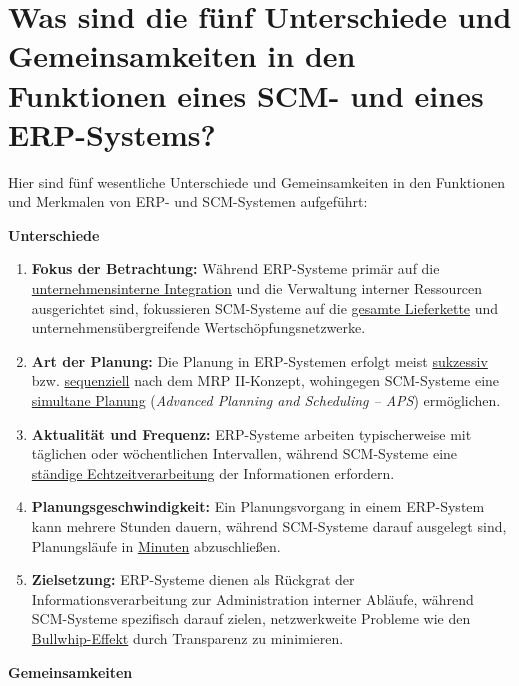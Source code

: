 \section{Was sind die fünf Unterschiede und Gemeinsamkeiten in den Funktionen eines \acs{SCM}- und eines \acs{ERP}-Systems?} \par Hier sind fünf wesentliche Unterschiede und Gemeinsamkeiten in den Funktionen und Merkmalen von \acs{ERP}- und \acs{SCM}-Systemen aufgeführt: \par \textbf{Unterschiede}
\begin{enumerate}[label=\arabic*.), leftmargin=*]
    \item \textbf{Fokus der Betrachtung:} Während \acs{ERP}-Systeme primär auf die \uline{unternehmensinterne Integration} und die Verwaltung interner Ressourcen ausgerichtet sind, fokussieren \acs{SCM}-Systeme auf die \uline{gesamte Lieferkette} und unternehmensübergreifende Wertschöpfungsnetzwerke. \cite{42}
    \item \textbf{Art der Planung:} Die Planung in \acs{ERP}-Systemen erfolgt meist \uline{sukzessiv} \acs{bzw.} \uline{sequenziell} nach dem \acs{MRP} II-Konzept, wohingegen \acs{SCM}-Systeme eine \uline{simultane Planung} (\textit{Advanced Planning and Scheduling – \acs{APS}}) ermöglichen. \cite{42}
    \item \textbf{Aktualität und Frequenz:} \acs{ERP}-Systeme arbeiten typischerweise mit täglichen oder wöchentlichen Intervallen, während \acs{SCM}-Systeme eine \uline{ständige Echtzeitverarbeitung} der Informationen erfordern. \cite{42}
    \item \textbf{Planungsgeschwindigkeit:} Ein Planungsvorgang in einem \acs{ERP}-System kann mehrere Stunden dauern, während \acs{SCM}-Systeme darauf ausgelegt sind, Planungsläufe in \uline{Minuten} abzuschließen. \cite{42}
    \item \textbf{Zielsetzung:} \acs{ERP}-Systeme dienen als Rückgrat der Informationsverarbeitung zur Administration interner Abläufe, während \acs{SCM}-Systeme spezifisch darauf zielen, netzwerkweite Probleme wie den \uline{Bullwhip-Effekt} durch Transparenz zu minimieren. \cite{42}\cite{43}
\end{enumerate}
\textbf{Gemeinsamkeiten}
